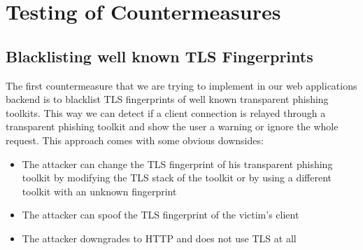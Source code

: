 \documentclass[12pt]{report}
\begin{document}
\newpage
\section{Testing of Countermeasures}
\subsection{Blacklisting well known TLS Fingerprints}
The first countermeasure that we are trying to implement in our web applications backend is to blacklist TLS fingerprints of well known transparent phishing toolkits. This way we can detect if a client connection is relayed through a transparent phishing toolkit and show the user a warning or ignore the whole request. This approach comes with some obvious downsides:

\begin{itemize}
  \item The attacker can change the TLS fingerprint of his transparent phishing toolkit by modifying the TLS stack of the toolkit or by using a different toolkit with an unknown fingerprint
  \item The attacker can spoof the TLS fingerprint of the victim's client
  \item The attacker downgrades to HTTP and does not use TLS at all
\end{itemize}
\end{document}
